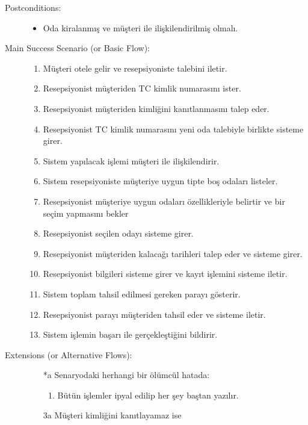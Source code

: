 \documentclass[12pt,a4paper]{report}
\begin{document}
\begin{description}
\item[Postconditions:] \hspace{10mm}
\begin{itemize}
\item Oda kiralanmış ve müşteri ile ilişkilendirilmiş olmalı.
\end{itemize}
\item[Main Success Scenario (or Basic Flow):] \hspace{10mm}
\begin{enumerate}
\item Müşteri otele gelir ve resepsiyoniste talebini iletir.
\item Resepsiyonist müşteriden TC kimlik numarasını ister.
\item Resepsiyonist müşteriden kimliğini kanıtlanmasını talep eder.
\item Resepsiyonist TC kimlik numarasını yeni oda talebiyle birlikte sisteme girer.
\item Sistem yapılacak işlemi müşteri ile ilişkilendirir.
\item Sistem resepsiyoniste müşteriye uygun tipte boş odaları listeler.
\item Resepsiyonist müşteriye uygun odaları özellikleriyle belirtir ve bir seçim yapmasını bekler
\item Resepsiyonist seçilen odayı sisteme girer.
\item Resepsiyonist müşteriden kalacağı tarihleri talep eder ve sisteme girer.
\item Resepsiyonist bilgileri sisteme girer ve kayıt işlemini sisteme iletir.
\item Sistem toplam tahsil edilmesi gereken parayı gösterir.
\item Resepsiyonist parayı müşteriden tahsil eder ve sisteme iletir.
\item Sistem işlemin başarı ile gerçekleştiğini bildirir.
\end{enumerate}
\item[Extensions (or Alternative Flows):] \hspace{10mm}
\begin{itemize}
\item[*a] Senaryodaki herhangi bir ölümcül hatada:
    \begin{enumerate}
    \item Bütün işlemler ipyal edilip her şey baştan yazılır.
    \end{enumerate}
\item[3a] Müşteri kimliğini kanıtlayamaz ise 
    \begin{enumerate}

\end{enumerate}
\end{itemize}
\end{description}
\end{document}
